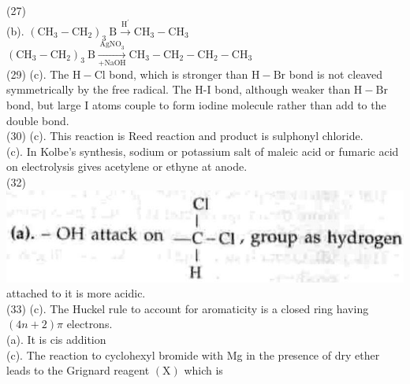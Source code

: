 \documentclass[10pt]{article}
\begin{document}
(27)\\
(b). $\left(\mathrm{CH}_{3}-\mathrm{CH}_{2}\right)_{3} \mathrm{~B} \xrightarrow{\mathrm{H}^{\prime}} \mathrm{CH}_{3}-\mathrm{CH}_{3}$\\
$\left(\mathrm{CH}_{3}-\mathrm{CH}_{2}\right)_{3} \mathrm{~B} \xrightarrow[+\mathrm{NaOH}]{\mathrm{AgNO}_{3}} \mathrm{CH}_{3}-\mathrm{CH}_{2}-\mathrm{CH}_{2}-\mathrm{CH}_{3}$\\
(29) (c). The $\mathrm{H}-\mathrm{Cl}$ bond, which is stronger than $\mathrm{H}-\mathrm{Br}$ bond is not cleaved symmetrically by the free radical. The H-I bond, although weaker than $\mathrm{H}-\mathrm{Br}$ bond, but large I atoms couple to form iodine molecule rather than add to the double bond.\\
(30) (c). This reaction is Reed reaction and product is sulphonyl chloride.\\
(c). In Kolbe's synthesis, sodium or potassium salt of maleic acid or fumaric acid on electrolysis gives acetylene or ethyne at anode.\\
(32)\\
\includegraphics[max width=\textwidth, center]{2025_01_28_8470952b98110cec3aabg-242(5)}\\
attached to it is more acidic.\\
(33) (c). The Huckel rule to account for aromaticity is a closed ring having $(4 n+2) \pi$ electrons.\\
(a). It is cis addition\\
(c). The reaction to cyclohexyl bromide with Mg in the presence of dry ether leads to the Grignard reagent $(\mathrm{X})$ which is\\
\end{document}
